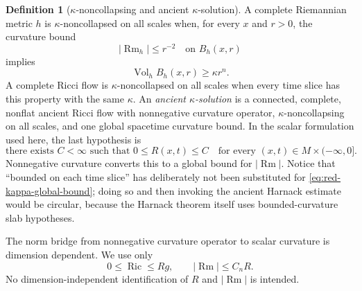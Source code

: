 \documentclass[10pt]{coll-l}
\theoremstyle{definition}
\newtheorem{definition}[theorem]{Definition}
\theoremstyle{remark}
\numberwithin{section}{chapter}
\numberwithin{equation}{chapter}
\newcommand{\Ric}{\operatorname{Ric}}
\newcommand{\Rm}{\operatorname{Rm}}
\newcommand{\Vol}{\operatorname{Vol}}
\begin{document}
\begin{definition}[$\kappa$-noncollapsing and ancient $\kappa$-solution]
\label{def:red-kappa-solution}
A complete Riemannian metric $h$ is $\kappa$-noncollapsed on all scales when,
for every $x$ and $r>0$, the curvature bound
\begin{equation}
                 |\Rm_h|\leq r^{-2}
                 \quad\text{on }B_h(x,r)                \label{eq:red-noncollapse-curvature-ball}
\end{equation}
implies
\begin{equation}
                  \Vol_hB_h(x,r)\geq\kappa r^n.
                                                               \label{eq:red-kappa-noncollapse}
\end{equation}
A complete Ricci flow is $\kappa$-noncollapsed on all scales when every time
slice has this property with the same $\kappa$.
An \emph{ancient $\kappa$-solution} is a connected, complete, nonflat
ancient Ricci flow with nonnegative curvature operator,
$\kappa$-noncollapsing on all scales, and one global spacetime curvature
bound.  In the scalar formulation used here, the last hypothesis is
\begin{equation}
          \text{there exists }C<\infty\text{ such that }
          0\leq R(x,t)\leq C
          \quad\text{for every }(x,t)\in M\times(-\infty,0].  \label{eq:red-kappa-global-bound}
\end{equation}
Nonnegative curvature converts this to a global bound for $|\Rm|$.  Notice
that ``bounded on each time slice'' has deliberately not been substituted
for \eqref{eq:red-kappa-global-bound}; doing so and then invoking the ancient
Harnack estimate would be circular, because the Harnack theorem itself uses
bounded-curvature slab hypotheses.
\end{definition}

The norm bridge from nonnegative curvature operator to scalar curvature is
dimension dependent.  We use only
\begin{equation}
                  0\leq\Ric\leq Rg,
                  \qquad |\Rm|\leq C_nR.                \label{eq:red-nonnegative-curvature-bridges}
\end{equation}
No dimension-independent identification of $R$ and $|\Rm|$ is intended.
\end{document}
